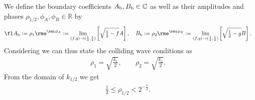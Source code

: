 \documentclass[12pt]{iopart}
\begin{document}
We define the boundary coefficients $A_{\rm b}, B_{\rm b}\in \mathbb{C}$ as well as their amplitudes and phases $\rho_{1/2},\phi_A,\phi_B\in \mathbb{R}$ by
\begin{eqnarray}
\fl A_{\rm b}:=\rho_1 \rme^{\rmi \phi_A}:=\lim_{(f,g)\rightarrow(\frac12,\frac12)} \left[\sqrt{\mbox{$\frac12$}-f}A\right], 
\quad
B_{\rm b}:=\rho_2 \rme^{\rmi \phi_B}:=\lim_{(f,g)\rightarrow(\frac12,\frac12)} \left[\sqrt{\mbox{$\frac12$}-g}B\right].
\end{eqnarray}
Considering  we can thus state the colliding wave conditions  as
\begin{eqnarray}
\rho_1=\sqrt{\frac{k_1}{2}},\quad\quad
\rho_2=\sqrt{\frac{k_2}{2}}.
\end{eqnarray}
From the domain  of $k_{1/2}$ we get
\begin{eqnarray} \label{rhoGrenze}
\mbox{$\frac12$}\leq \rho_{1/2} <2^{-\frac12}.
\end{eqnarray}
\end{document}

